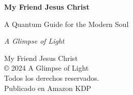 \documentclass[12pt,twoside,openany]{book}
\begin{document}
\frontmatter

\begin{titlepage}
    \centering
    \vspace*{2cm}
    {\Huge \textbf{My Friend Jesus Christ} \par}
    \vspace{1cm}
    {\Large A Quantum Guide for the Modern Soul \par}
    \vfill
    {\Large \textit{A Glimpse of Light} \par}
    \vspace*{3cm}
\end{titlepage}

\newpage
\thispagestyle{empty}
\vspace*{12cm}
\begin{center}
    \small
    My Friend Jesus Christ \\
    © 2024 A Glimpse of Light \\
    Todos los derechos reservados. \\
    Publicado en Amazon KDP \\
\end{center}

\tableofcontents

\mainmatter


\newpage


\newpage


\newpage


\newpage


\newpage


\newpage


\newpage


\newpage


\newpage


\newpage


\newpage


\newpage


\newpage


\newpage


\newpage


\newpage


\newpage


\newpage
\end{document}
